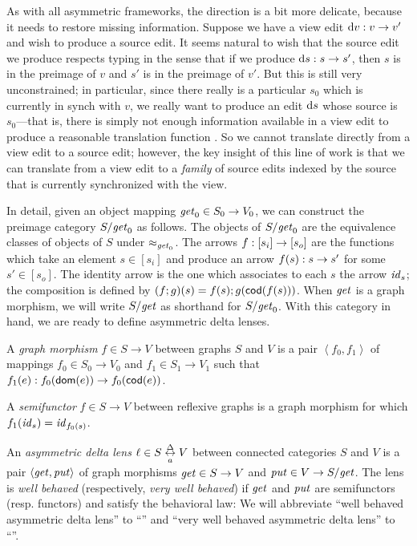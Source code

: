 As with all asymmetric frameworks, the \PUT direction is a bit more
delicate, because it needs to restore missing information. Suppose we have a
view edit $\textrm{d} v : v \to v'$ and wish to produce a source edit. It seems
natural to wish that the source edit we produce respects typing in the sense
that if we produce $\textrm{d} s : s \to s'$, then $s$ is in the preimage of $v$
and $s'$ is in the preimage of $v'$. But this is still very unconstrained;
in particular, since there really is a particular $s_0$ which is currently
in synch with $v$, we really want to produce an edit $\textrm{d} s$ whose source is
$s_0$---that is, there is simply not enough information available in a view
edit to produce a reasonable translation function \PUT. So we cannot
translate directly from a view edit to a source edit; however, the key
insight of this line of work is that we can translate from a view edit to a
\emph{family} of source edits indexed by the source that is currently
synchronized with the view.

In detail, given an object mapping $\mathit{get}_0 \in S_0 \to V_0$, we can
construct the preimage category $S/\mathit{get}_0$ as follows. The objects of
$S/\mathit{get}_0$ are the equivalence classes of objects of $S$ under
$\approx_{\mathit{get}_0}$. The arrows $f : [s_i] \to [s_o]$ are the functions
which take an element $s \in [s_i]$ and produce an arrow $f(s) : s \to
s'$ for some $s' \in [s_o]$. The identity arrow is the one which associates
to each $s$ the arrow $\mathit{id}_s$; the composition is defined by
$(f;g)(s)=f(s);g(\mathsf{cod}(f(s)))$. When $\mathit{get}$ is a graph morphism, we will
write $S/\mathit{get}$ as shorthand for $S/\mathit{get}_0$. With this category in hand, we
are ready to define asymmetric delta lenses.

\begin{definition}
    A \emph{graph morphism} $f \in S \to V$ between graphs $S$ and $V$ is a
    pair $\left<f_0,f_1\right>$ of mappings $f_0 \in S_0 \to V_0$ and $f_1
    \in S_1 \to V_1$ such that $f_1(e) : f_0(\mathsf{dom}(e)) \to
    f_0(\mathsf{cod}(e))$.
\end{definition}

\begin{definition}
    A \emph{semifunctor} $f \in S \to V$ between reflexive graphs is a graph
    morphism for which $f_1(\mathit{id}_s)=\mathit{id}_{f_0(s)}$.
\end{definition}

\begin{definition}
    An \emph{asymmetric delta lens} $\ell \in S \underset{a}{\overset{\Delta}{\leftrightarrow}} V$ between connected
    categories $S$ and $V$ is a pair $\left<\mathit{get},\mathit{put}\right>$ of graph
    morphisms $\mathit{get} \in S \to V$ and $\mathit{put} \in V \to S/\mathit{get}$. The lens is
    \emph{well behaved} (respectively, \emph{very well behaved}) if $\mathit{get}$
    and $\mathit{put}$ are semifunctors (resp. functors) and satisfy the behavioral
    law:
    We will abbreviate ``well behaved asymmetric delta lens'' to ``\WBADL''
    and ``very well behaved asymmetric delta lens'' to ``\VWBADL''.
\end{definition}

